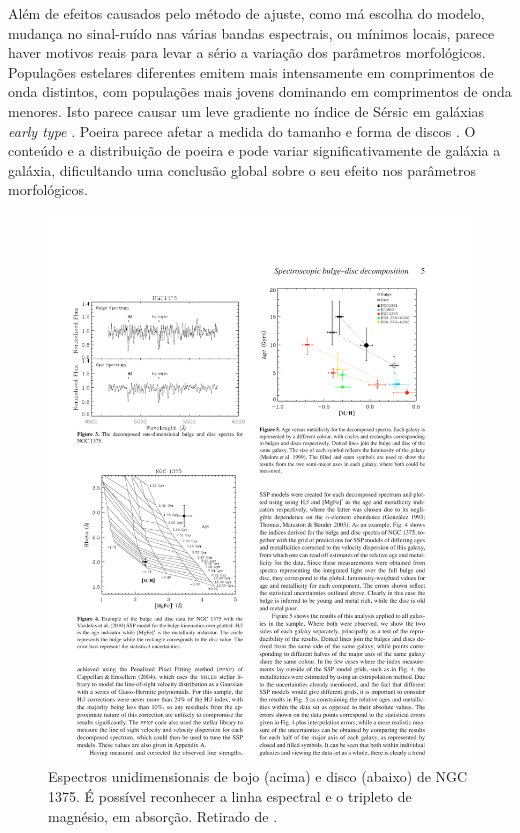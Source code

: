 Além de efeitos causados pelo método de ajuste, como má escolha do modelo,
mudança no sinal-ruído nas várias bandas espectrais, ou mínimos locais, parece haver
motivos reais para levar a sério a variação dos parâmetros morfológicos.
Populações estelares diferentes emitem mais intensamente em comprimentos de onda
distintos, com populações mais jovens dominando em comprimentos de onda menores.
Isto parece causar um leve gradiente no índice de Sérsic em galáxias {\em early
type} \citep{LaBarbera2009}. Poeira parece afetar a medida do tamanho
e forma de discos \citep{Mollenhoff2006}. O conteúdo e a distribuição de poeira e pode
variar significativamente de galáxia a galáxia, dificultando uma conclusão
global sobre o seu efeito nos parâmetros morfológicos.

\begin{figure}
	\includegraphics{figuras/johnston-spectra}
	\caption[Espectros das componentes morfológicas.] {Espectros unidimensionais de
	bojo (acima) e disco (abaixo) de NGC 1375. É possível reconhecer a
	linha espectral \Hbeta e o tripleto de magnésio, em absorção. Retirado de
	\citet{Johnston2012}.}
	\label{fig:spectraJohnston}
\end{figure}

